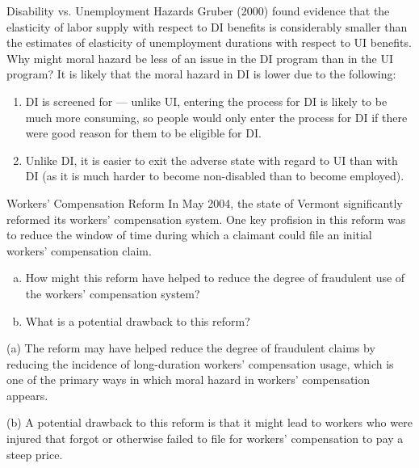 \documentclass[8pt]{extarticle}
\title{}
\author{Avinash Iyer}
\date{}
\begin{document}
  \begin{problem}{Disability vs. Unemployment Hazards}
    Gruber (2000) found evidence that the elasticity of labor supply with respect to DI benefits is considerably smaller than the estimates of elasticity of unemployment durations with respect to UI benefits. Why might moral hazard be less of an issue in the DI program than in the UI program?
    \tcblower
    It is likely that the moral hazard in DI is lower due to the following:
    \begin{enumerate}[(1)]
      \item DI is screened for --- unlike UI, entering the process for DI is likely to be much more consuming, so people would only enter the process for DI if there were good reason for them to be eligible for DI.
      \item Unlike DI, it is easier to exit the adverse state with regard to UI than with DI (as it is much harder to become non-disabled than to become employed).
    \end{enumerate}
  \end{problem}
  \begin{problem}{Workers' Compensation Reform}
    In May 2004, the state of Vermont significantly reformed its workers' compensation system. One key profision in this reform was to reduce the window of time during which a claimant could file an initial workers' compensation claim.
    \begin{enumerate}[(a)]
      \item How might this reform have helped to reduce the degree of fraudulent use of the workers' compensation system?
      \item What is a potential drawback to this reform?
    \end{enumerate}
    \tcblower
    \begin{problem}{(a)}
      The reform may have helped reduce the degree of fraudulent claims by reducing the incidence of long-duration workers' compensation usage, which is one of the primary ways in which moral hazard in workers' compensation appears.
    \end{problem}
    \begin{problem}{(b)}
      A potential drawback to this reform is that it might lead to workers who were injured that forgot or otherwise failed to file for workers' compensation to pay a steep price.
    \end{problem}
  \end{problem}
\end{document}
